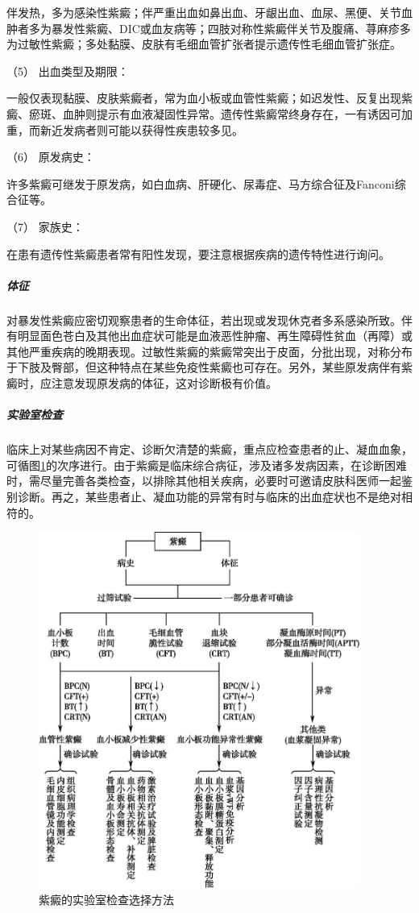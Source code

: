 伴发热，多为感染性紫癜；伴严重出血如鼻出血、牙龈出血、血尿、黑便、关节血肿者多为暴发性紫癜、DIC或血友病等；四肢对称性紫癜伴关节及腹痛、荨麻疹多为过敏性紫癜；多处黏膜、皮肤有毛细血管扩张者提示遗传性毛细血管扩张症。

\hypertarget{text00036.htmlux5cux23CHP1-14-2-1-5}{}
（5） 出血类型及期限：

一般仅表现黏膜、皮肤紫癜者，常为血小板或血管性紫癜；如迟发性、反复出现紫癜、瘀斑、血肿则提示有血液凝固性异常。遗传性紫癜常终身存在，一有诱因可加重，而新近发病者则可能以获得性疾患较多见。

\hypertarget{text00036.htmlux5cux23CHP1-14-2-1-6}{}
（6） 原发病史：

许多紫癜可继发于原发病，如白血病、肝硬化、尿毒症、马方综合征及Fanconi综合征等。

\hypertarget{text00036.htmlux5cux23CHP1-14-2-1-7}{}
（7） 家族史：

在患有遗传性紫癜患者常有阳性发现，要注意根据疾病的遗传特性进行询问。

\subparagraph{体征}

对暴发性紫癜应密切观察患者的生命体征，若出现或发现休克者多系感染所致。伴有明显面色苍白及其他出血症状可能是血液恶性肿瘤、再生障碍性贫血（再障）或其他严重疾病的晚期表现。过敏性紫癜的紫癜常突出于皮面，分批出现，对称分布于下肢及臀部，但这种特点在某些免疫性紫癜也可存在。另外，某些原发病伴有紫癜时，应注意发现原发病的体征，这对诊断极有价值。

\subparagraph{实验室检查}

临床上对某些病因不肯定、诊断欠清楚的紫癜，重点应检查患者的止、凝血血象，可循图\ref{fig14-1}的次序进行。由于紫癜是临床综合病征，涉及诸多发病因素，在诊断困难时，需尽量完善各类检查，以排除其他相关疾病，必要时可邀请皮肤科医师一起鉴别诊断。再之，某些患者止、凝血功能的异常有时与临床的出血症状也不是绝对相符的。

\begin{figure}[!htbp]
 \centering
 \includegraphics[width=4.14583in,height=4.60417in]{./images/Image00061.jpg}
 \captionsetup{justification=centering}
 \caption{紫癜的实验室检查选择方法}
 \label{fig14-1}
  \end{figure} 

